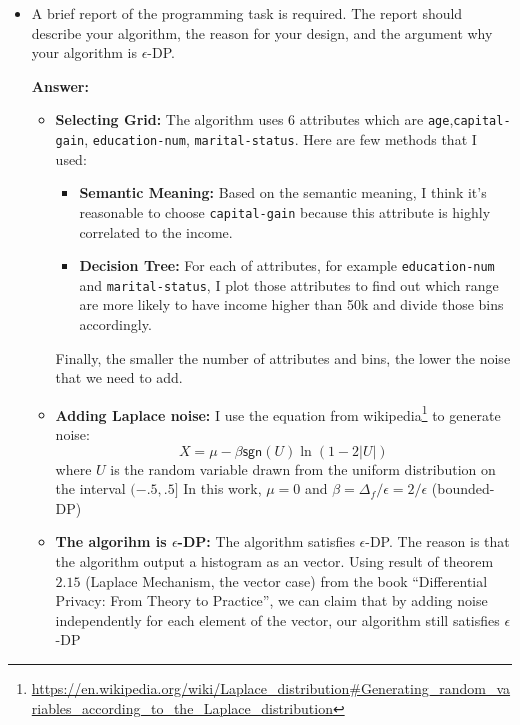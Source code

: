 \documentclass{article}
\newcommand{\ans}[1]{\begin{mdframed}\textbf{Answer: }#1\end{mdframed}}
\begin{document}
\begin{itemize}
	\item A brief report of the programming task is required. The report should describe your algorithm, the reason for your design, and the argument why your algorithm is $\epsilon$-DP.
	\ans{

		\begin{itemize}
			\item[] \textbf{Selecting Grid: } 
			The algorithm uses 6 attributes which are \texttt{age},\texttt{capital-gain}, \texttt{education-num}, \texttt{marital-status}. Here are few methods that I used:
			\begin{itemize}
				\item \textbf{Semantic Meaning:}
				Based on the semantic meaning, I think it's reasonable to choose \texttt{capital-gain} because this attribute is highly correlated to the income. 

				\item \textbf{Decision Tree:}
				For each of attributes, for example \texttt{education-num} and \texttt{marital-status}, I plot those attributes to find out which range are more likely to have income higher than 50k and divide those bins accordingly. 

			\end{itemize}
			Finally, the smaller the number of attributes and bins, the lower the noise that we need to add. 

			\item[] \textbf{Adding Laplace noise:} I use the equation from wikipedia\footnote{\url{https://en.wikipedia.org/wiki/Laplace_distribution\#Generating_random_variables_according_to_the_Laplace_distribution}} to generate noise:
				\begin{equation}
					X = \mu - \beta \mathsf{sgn}(U)\ln(1-2|U|)
				\end{equation}
				where $U$ is the random variable drawn from the uniform distribution on the interval $(-.5,.5]$
				In this work, $\mu = 0$ and $\beta=\Delta_f/\epsilon= 2/\epsilon$ (bounded-DP)
			\item[] \textbf{The algorihm is $\epsilon$-DP:}
			The algorithm satisfies $\epsilon$-DP. The reason is that the algorithm output a histogram as an vector. Using result of theorem $2.15$ (Laplace Mechanism, the vector case) from the book ``Differential Privacy: From Theory to Practice'', we can claim that by adding noise independently for each element of the vector, our algorithm still satisfies $\epsilon$-DP
		\end{itemize}
	}
	

\end{itemize}
\end{document}
